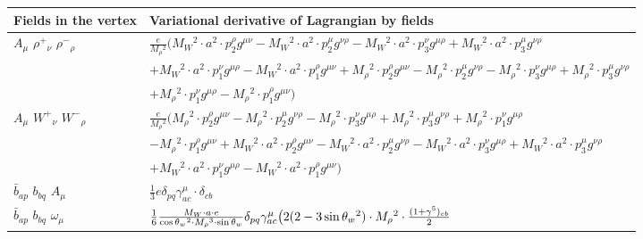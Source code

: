 \textwidth 17cm
\textheight 25cm
\hoffset -3cm
\voffset -1cm
\pagestyle{empty}

\begin{center}

\begin{tabular}{|l|l|} \hline
Fields in the vertex & Variational derivative of Lagrangian by fields \\ \hline
${A}_{\mu }$ \phantom{-} $\rho^+{}_{\nu }$ \phantom{-} $\rho^-{}_{\rho }$ \phantom{-}  &
	$\frac{ e}{ M_\rho{}^2 }\big( M_W{}^2 \cdot  a{}^2 \cdot p_2^\rho g^{\mu \nu} - M_W{}^2 \cdot  a{}^2 \cdot p_2^\mu g^{\nu \rho} - M_W{}^2 \cdot  a{}^2 \cdot p_3^\nu g^{\mu \rho} + M_W{}^2 \cdot  a{}^2 \cdot p_3^\mu g^{\nu \rho} $ \\[2mm]
  & $+ M_W{}^2 \cdot  a{}^2 \cdot p_1^\nu g^{\mu \rho} - M_W{}^2 \cdot  a{}^2 \cdot p_1^\rho g^{\mu \nu} + M_\rho{}^2 \cdot p_2^\rho g^{\mu \nu} - M_\rho{}^2 \cdot p_2^\mu g^{\nu \rho} - M_\rho{}^2 \cdot p_3^\nu g^{\mu \rho} + M_\rho{}^2 \cdot p_3^\mu g^{\nu \rho} $ \\[2mm]
  & $+ M_\rho{}^2 \cdot p_1^\nu g^{\mu \rho} - M_\rho{}^2 \cdot p_1^\rho g^{\mu \nu} \big)$\\[2mm]
${A}_{\mu }$ \phantom{-} $W^+{}_{\nu }$ \phantom{-} $W^-{}_{\rho }$ \phantom{-}  &
	$\frac{ e}{ M_\rho{}^2 }\big( M_\rho{}^2 \cdot p_2^\rho g^{\mu \nu} - M_\rho{}^2 \cdot p_2^\mu g^{\nu \rho} - M_\rho{}^2 \cdot p_3^\nu g^{\mu \rho} + M_\rho{}^2 \cdot p_3^\mu g^{\nu \rho} + M_\rho{}^2 \cdot p_1^\nu g^{\mu \rho} $ \\[2mm]
  & $- M_\rho{}^2 \cdot p_1^\rho g^{\mu \nu} + M_W{}^2 \cdot  a{}^2 \cdot p_2^\rho g^{\mu \nu} - M_W{}^2 \cdot  a{}^2 \cdot p_2^\mu g^{\nu \rho} - M_W{}^2 \cdot  a{}^2 \cdot p_3^\nu g^{\mu \rho} + M_W{}^2 \cdot  a{}^2 \cdot p_3^\mu g^{\nu \rho} $ \\[2mm]
  & $+ M_W{}^2 \cdot  a{}^2 \cdot p_1^\nu g^{\mu \rho} - M_W{}^2 \cdot  a{}^2 \cdot p_1^\rho g^{\mu \nu} \big)$\\[2mm]
$\bar{b}{}_{a p }$ \phantom{-} $b{}_{b q }$ \phantom{-} ${A}_{\mu }$ \phantom{-}  &
	$\frac{1}{3} e\delta_{p q} \gamma_{a c}^\mu \cdot \delta_{c b} $\\[2mm]
$\bar{b}{}_{a p }$ \phantom{-} $b{}_{b q }$ \phantom{-} $\omega{}_{\mu }$ \phantom{-}  &
	$\frac{1}{6}\frac{ M_W \cdot a \cdot e}{ \cos{\theta}_w{}^2  \cdot M_\rho{}^3  \cdot \sin{\theta}_w}\delta_{p q} \gamma_{a c}^\mu \big(2 (2-3 \sin{\theta}_w {}^2)\cdot  M_\rho{}^2 \cdot {(1+\gamma^5)_{c b}\over 2} $ \\[2mm]

\end{tabular}
\end{center}
